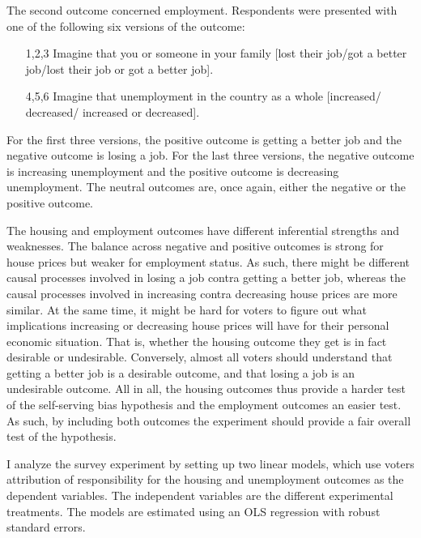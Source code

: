 \documentclass[a4paper,11pt]{article}
\begin{document}
	The second outcome concerned employment. Respondents were presented with one of the following six versions of the outcome:
	
	\begin{itemize}
		\item [1,2,3] Imagine that you or someone in your family [lost their job/got a better job/lost their job or got a better job].
		\item [4,5,6] Imagine that unemployment in the country as a whole [increased/ decreased/ increased or decreased].
	\end{itemize}
	
	For the first three versions, the  positive outcome is getting a better job and the negative outcome is losing a job. For the last three versions, the negative outcome is increasing unemployment and the positive outcome is decreasing unemployment. The neutral outcomes are, once again, either the negative or the positive outcome. 
	
	The housing and employment outcomes have different inferential strengths and weaknesses. The balance across negative and positive outcomes is strong for house prices but weaker for employment status. As such, there might be different causal processes involved in losing a job contra getting a better job, whereas the causal processes involved in increasing contra decreasing house prices are more similar. At the same time, it might be hard for voters to figure out what implications increasing or decreasing house prices will have for their personal economic situation. That is, whether the housing outcome they get is in fact desirable or undesirable. Conversely, almost all voters should understand that getting a better job is a desirable outcome, and that losing a job is an undesirable outcome. All in all, the housing outcomes thus provide a harder test of the self-serving bias hypothesis and the employment outcomes an easier test. As such, by including both outcomes the experiment should provide a fair overall test of the hypothesis.
	
	I analyze the survey experiment by setting up two linear models, which use voters attribution of responsibility for the housing and unemployment outcomes as the dependent variables. The independent variables are the different experimental treatments. The models are estimated using an OLS regression with robust standard errors.
	
\end{document}
